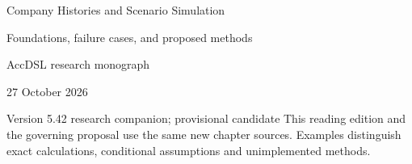 \documentclass[11pt,a4paper]{report}
\begin{document}
\hypersetup{pageanchor=false}
\begin{titlepage}
{\Huge Company Histories and Scenario Simulation\par}
\vspace{12mm}
{\Large Foundations, failure cases, and proposed methods\par}
\vspace{8mm}
AccDSL research monograph\par 27 October 2026\par Version 5.42 research companion; provisional candidate
\vfill
This reading edition and the governing proposal use the same new chapter sources. Examples distinguish exact calculations, conditional assumptions and unimplemented methods.
\end{titlepage}
\hypersetup{pageanchor=true}
\tableofcontents
\clearpage{}


























\clearpage\label{sim:body-end}

\begingroup\raggedright
\endgroup
\end{document}
